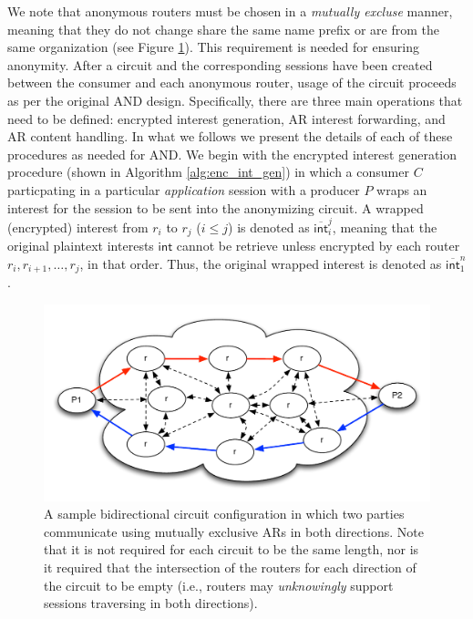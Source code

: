 We note that anonymous routers must be chosen in a \emph{mutually excluse} manner, meaning that they do not change share the same name prefix or are from the same organization (see Figure \ref{fig:pool}). This requirement is needed for ensuring anonymity. After a circuit and the corresponding sessions have been created between the consumer and each anonymous router, usage of the circuit proceeds as per the original {\sf AND} design. Specifically, there are three main operations that need to be defined: encrypted interest generation, AR interest forwarding, and AR content handling. In what we follows we present the details of each of these procedures as needed for {\sf AND}. We begin with the encrypted interest generation procedure (shown in Algorithm \ref{alg:enc_int_gen}) in which a consumer $C$ particpating in a particular \emph{application} session with a producer $P$ wraps an interest for the session to be sent into the anonymizing circuit. A wrapped (encrypted) interest from $r_i$ to $r_j$ ($i \leq j$) is denoted as $\overline{\mathsf{int}}_i^j$, meaning that the original plaintext interests $\mathsf{int}$ cannot be retrieve unless encrypted by each router $r_i,r_{i+1},\dots,r_j$, in that order. Thus, the original wrapped interest is denoted as $\overline{\mathsf{int}}_1^n$.

\begin{figure}[ht!]
\begin{center}
\includegraphics[scale=0.5]{./images/pool.pdf}
\end{center}
\caption{A sample bidirectional circuit configuration in which two parties communicate using mutually exclusive ARs in both directions. Note that it is not required for each circuit to be the same length, nor is it required that the intersection of the routers for each direction of the circuit to be empty (i.e., routers may \emph{unknowingly} support sessions traversing in both directions).}
\label{fig:pool}
\end{figure}


